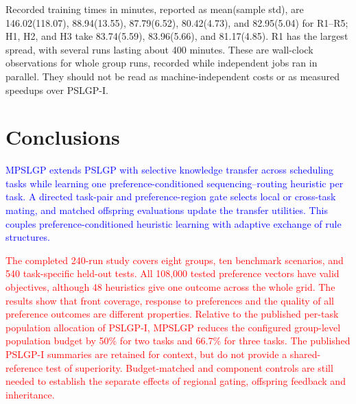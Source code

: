 \documentclass[10pt,journal]{IEEEtran}
\newcommand{\revision}[1]{\textcolor{blue}{#1}}
\newcommand{\ablationrevision}[1]{\textcolor{red}{#1}}
\begin{document}
Recorded training times in minutes, reported as mean(sample std), are 146.02(118.07), 88.94(13.55), 87.79(6.52), 80.42(4.73), and 82.95(5.04) for R1--R5; H1, H2, and H3 take 83.74(5.59), 83.96(5.66), and 81.17(4.85). R1 has the largest spread, with several runs lasting about 400 minutes. These are wall-clock observations for whole group runs, recorded while independent jobs ran in parallel. They should not be read as machine-independent costs or as measured speedups over PSLGP-I.
\endgroup

\section{Conclusions}
\label{sec:conclusions}
\revision{MPSLGP extends PSLGP with selective knowledge transfer across scheduling tasks while learning one preference-conditioned sequencing--routing heuristic per task. A directed task-pair and preference-region gate selects local or cross-task mating, and matched offspring evaluations update the transfer utilities. This couples preference-conditioned heuristic learning with adaptive exchange of rule structures.}

\ablationrevision{The completed 240-run study covers eight groups, ten benchmark scenarios, and 540 task-specific held-out tests. All 108,000 tested preference vectors have valid objectives, although 48 heuristics give one outcome across the whole grid. The results show that front coverage, response to preferences and the quality of all preference outcomes are different properties. Relative to the published per-task population allocation of PSLGP-I, MPSLGP reduces the configured group-level population budget by 50\% for two tasks and 66.7\% for three tasks. The published PSLGP-I summaries are retained for context, but do not provide a shared-reference test of superiority. Budget-matched and component controls are still needed to establish the separate effects of regional gating, offspring feedback and inheritance.}



\end{document}

